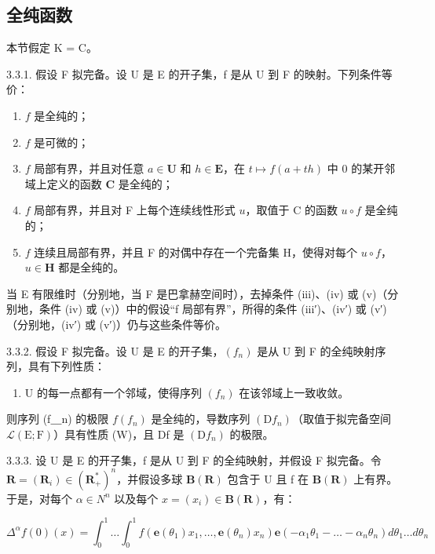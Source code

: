 \subsection{全纯函数}

本节假定 K = C。

3.3.1. 假设 F 拟完备。设 U 是 E 的开子集，f 是从 U 到 F 的映射。下列条件等价：

\begin{enumerate}
\def\labelenumi{(\roman{enumi})}
\item
  \(f\) 是全纯的；
\item
  \(f\) 是可微的；
\item
  \(f\) 局部有界，并且对任意 \(a \in \mathbf{U}\) 和 \(h \in \mathbf{E}\)，在 \(t \mapsto f(a + th)\) 中 0 的某开邻域上定义的函数 \(\mathbf{C}\) 是全纯的；
\item
  \(f\) 局部有界，并且对 F 上每个连续线性形式 \(u\)，取值于 C 的函数 \(u \circ f\) 是全纯的；
\item
  \(f\) 连续且局部有界，并且 F 的对偶中存在一个完备集 H，使得对每个 \(u \circ f\)，\(u \in \mathbf{H}\) 都是全纯的。
\end{enumerate}

当 E 有限维时（分别地，当 F 是巴拿赫空间时），去掉条件 (iii)、(iv) 或 (v)（分别地，条件 (iv) 或 (v)）中的假设“f 局部有界”，所得的条件 (iii′)、(iv′) 或 (v′)（分别地，(iv′) 或 (v′)）仍与这些条件等价。

3.3.2. 假设 F 拟完备。设 U 是 E 的开子集，\((f_{n})\) 是从 U 到 F 的全纯映射序列，具有下列性质：

\begin{enumerate}
\def\labelenumi{(\Alph{enumi})}
\setcounter{enumi}{22}
\tightlist
\item
  U 的每一点都有一个邻域，使得序列 \((f_{n})\) 在该邻域上一致收敛。
\end{enumerate}

则序列 (f＿n) 的极限 \(f\)\((f_{n})\) 是全纯的，导数序列 \((\mathrm{D}f_{n})\)（取值于拟完备空间 \(\mathcal{L}(\mathrm{E};\mathrm{F})\)）具有性质 (W)，且 Df 是 \((\mathrm{D}f_{n})\) 的极限。

3.3.3. 设 U 是 E 的开子集，f 是从 U 到 F 的全纯映射，并假设 F 拟完备。令 \(\mathbf{R} = (\mathbf{R}_{i}) \in (\mathbf{R}_{+}^{*})^{n}\)，并假设多球 \(\mathbf{B}(\mathbf{R})\) 包含于 U 且 f 在 \(\mathbf{B}(\mathbf{R})\) 上有界。于是，对每个 \(\alpha \in N^{n}\) 以及每个 \(x = (x_{i}) \in \mathbf{B}(\mathbf{R})\)，有：

\[
\Delta^ {\alpha} f (0) (x) = \int_ {0} ^ {1} \dots \int_ {0} ^ {1} f (\mathbf {e} (\theta_ {1}) x _ {1}, \dots , \mathbf {e} (\theta_ {n}) x _ {n}) \mathbf {e} (- \alpha_ {1} \theta_ {1} - \dots - \alpha_ {n} \theta_ {n}) d \theta_ {1} \dots d \theta_ {n}
\]

